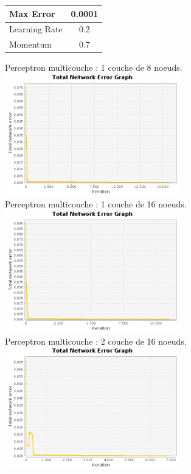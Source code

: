 \documentclass[10pt]{report}
\begin{document}
\begin{center}
\begin{tabular}{|l|c|}
	\hline
	Max Error & 0.0001 \\
	\hline
	Learning Rate & 0.2 \\
	\hline
	Momentum & 0.7 \\
	\hline
\end{tabular}

Perceptron multicouche : 1 couche de 8 noeuds.\\
\includegraphics[height=200px]{img/SQUARE_8_101_-4.png}\\
Perceptron multicouche : 1 couche de 16 noeuds.\\
\includegraphics[height=200px]{img/SQUARE_16_101_-4.png}\\
Perceptron multicouche : 2 couche de 16 noeuds.\\
\includegraphics[height=200px]{img/SQUARE_16_16_101_-4.png}\\
\end{center}
\end{document}
